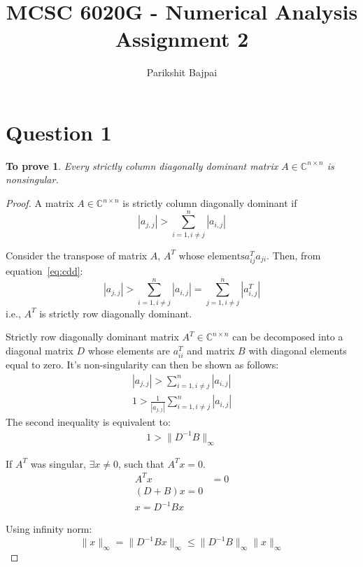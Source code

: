\documentclass[11pt, oneside]{article}
\title{MCSC 6020G - Numerical Analysis \\
        \Large Assignment 2}
\author{Parikshit Bajpai}
\date{}
\newtheorem*{remark}{To prove}
\begin{document}
\maketitle

\section*{Question 1}
	\begin{remark}
		Every strictly column diagonally dominant matrix $A \in \mathbb{C}^{n \times n}$ is nonsingular. 
	\end{remark}
	\begin{proof}
		A matrix $A \in \mathbb{C}^{n \times n}$ is strictly column diagonally dominant if 
		\begin{equation}\label{eq:cdd}
			|a_{j,j}| > \sum_{i=1, i\neq j}^n |a_{i,j}|
		\end{equation}
		
		Consider the transpose of matrix $A$, $A^T \text{ whose elements} a^T_{ij} a_{ji}$. Then, from equation~\eqref{eq:cdd}:
		\begin{equation}\label{eq:cdd}
			|a_{j,j}| >  \sum_{i=1, i\neq j}^n |a_{i,j}| = \sum_{j=1, i\neq j}^n |a^T_{i,j}|
		\end{equation}
		i.e., $A^T$ is strictly row diagonally dominant.  
		
		Strictly row diagonally dominant matrix $A^T \in \mathbb{C}^{n \times n}$ can be decomposed into a diagonal matrix $D$ whose elements are $a^T_{ii}$ and matrix $B$ with diagonal elements equal to zero. It's non-singularity can then be shown as follows:
		\begin{align}
			|a_{j,j}| > \sum_{i=1, i\neq j}^n |a_{i,j}|\\
			1 > \frac{1}{|a_{j,j}|} \sum_{i=1, i\neq j}^n |a_{i,j}|
		\end{align}
		The second inequality is equivalent to: 
		\begin{align} \label{eq:contra1}
			1 > \|D^{-1} B\|_{\infty}
		\end{align}
		
		If $A^T$ was singular, $\exists x \neq 0$, such that $A^Tx=0$.
		\begin{align}
			A^Tx &= 0 \\
			(D + B)x = 0\\
			x = D^{-1} B x
		\end{align}
		
		Using infinity norm:
		\begin{equation}
			\|x\|_{\infty}  =   \|D^{-1} B x \|_{\infty} \leq \|D^{-1} B\|_{\infty} \|x \|_{\infty}
		\end{equation}
		

\end{proof}
\end{document}
